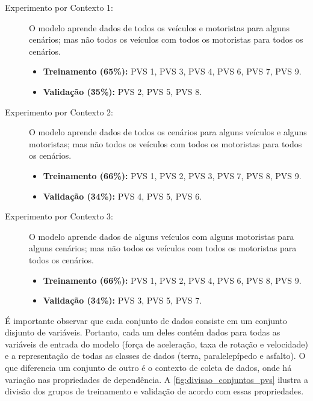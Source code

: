 \begin{description}
	
	\item[Experimento por Contexto 1:] O modelo aprende dados de todos os veículos e motoristas para alguns cenários; mas não todos os veículos com todos os motoristas para todos os cenários.
    \begin{itemize}
        \item \textbf{Treinamento (65\%):} PVS 1, PVS 3, PVS 4, PVS 6, PVS 7, PVS 9. 
        \item \textbf{Validação (35\%):} PVS 2, PVS 5, PVS 8.
    \end{itemize}
    
    \item[Experimento por Contexto 2:] O modelo aprende dados de todos os cenários para alguns veículos e alguns motoristas; mas não todos os veículos com todos os motoristas para todos os cenários.
    \begin{itemize}
        \item \textbf{Treinamento (66\%):} PVS 1, PVS 2, PVS 3, PVS 7, PVS 8, PVS 9.
        \item \textbf{Validação (34\%):} PVS 4, PVS 5, PVS 6.
    \end{itemize}
    
    \item[Experimento por Contexto 3:] O modelo aprende dados de alguns veículos com alguns motoristas para alguns cenários; mas não todos os veículos com todos os motoristas para todos os cenários.
    \begin{itemize}
        \item \textbf{Treinamento (66\%):} PVS 1, PVS 2, PVS 4, PVS 6, PVS 8, PVS 9.
        \item \textbf{Validação (34\%):} PVS 3, PVS 5, PVS 7.
    \end{itemize}
    
\end{description}

É importante observar que cada conjunto de dados consiste em um conjunto disjunto de variáveis. Portanto, cada um deles contém dados para todas as variáveis de entrada do modelo (força de aceleração, taxa de rotação e velocidade) e a representação de todas as classes de dados (terra, paralelepípedo e asfalto). O que diferencia um conjunto de outro é o contexto de coleta de dados, onde há variação nas propriedades de dependência. A \autoref{fig:divisao_conjuntos_pvs} ilustra a divisão dos grupos de treinamento e validação de acordo com essas propriedades.

